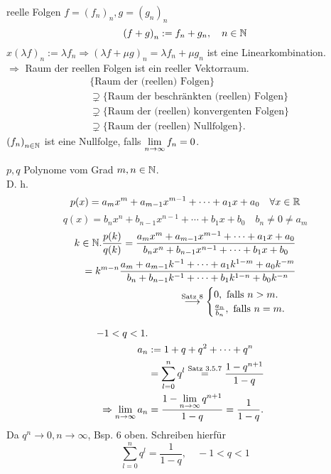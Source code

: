 \documentclass[../ana1.tex]{subfiles}
\begin{document}
reelle Folgen \(f = {(f_n)}_n, g = {(g_n)}_n  \) \\
\[ {(f+g)}_n := f_n + g_n, \quad n\in\mathbb{N} \]
\(x {(\lambda f)}_n := \lambda f_n \Rightarrow {(\lambda f + \mu g)}_n = \lambda f_n + \mu g_n \) ist eine Linearkombination.\\
\(\Rightarrow{}\) Raum der reellen Folgen ist ein reeller Vektorraum.
\begin{align*}
	&\{ \text{Raum der (reellen) Folgen} \} \\
	&\supsetneq \{ \text{Raum der beschränkten (reellen) Folgen} \} \\
	&\supsetneq \{ \text{Raum der (reellen) konvergenten Folgen} \} \\
	&\supsetneq \{ \text{Raum der (reellen) Nullfolgen} \}.
\end{align*}
\({(f_n)}_{n\in\mathbb{N}}\) ist eine Nullfolge, falls \( \lim\limits_{n\rightarrow\infty} f_n = 0 \).
\begin{bsp}[1]
	\( p,q \) Polynome vom Grad \(m,n\in\mathbb{N} \).\\
	D. h. \[ p(x) = a_m x^m + a_{m-1} x^{m-1} + \cdots + a_1 x + a_0 \quad \forall x\in\mathbb{R} \]
	\[q(x) = b_n x^n + b_{n-1} x^{n-1} + \cdots + b_1 x + b_0 \quad b_n \neq 0 \neq a_m \]
	\begin{align*}
		k\in\mathbb{N}. \frac{p(k)}{q(k)} = \frac{a_m x^m + a_{m-1} x^{m-1} + \cdots + a_1 x + a_0}{b_n x^n + b_{n-1} x^{n-1} + \cdots + b_1 x + b_0}\\
		= k^{m-n} \frac{a_m + a_{m-1} k^{-1} + \cdots + a_1 k^{1-m} + a_0 k^{-m} }{b_n + b_{n-1} k^{-1} + \cdots + b_1 k^{1-n} + b_0 k^{-n}}\\
		\overset{\text{Satz 8}}{\longrightarrow}
		\begin{cases}
			0, \text{ falls } n>m.\\
			\frac{a_n}{b_n}, \text{ falls } n = m.
		\end{cases}
	\end{align*}
\end{bsp}
\begin{bsp}
	\begin{align*}
		-1<q<1.\\
		a_n &:= 1 + q + q^2 + \cdots + q^n\\
		&= \sum_{l=0}^{n} q^l \overset{\text{Satz 3.5.7}}{=} \frac{1-q^{n+1}}{1-q}\\
		\Rightarrow \lim\limits_{n\rightarrow\infty} a_n &= \frac{1- \lim\limits_{n\rightarrow\infty} q^{n+1}}{1-q} = \frac{1}{1-q}.
	\end{align*}
	Da \(q^n \rightarrow 0, n\rightarrow\infty \), Bsp. 6 oben.
	Schreiben hierfür \[ \sum_{l=0}^{n} q^l = \frac{1}{1-q}, \quad -1<q<1 \]
\end{bsp}
\end{document}
